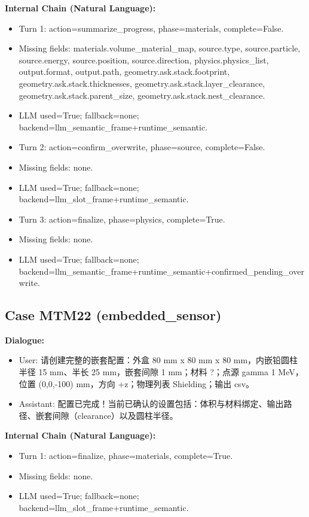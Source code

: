 \documentclass[11pt]{ctexart}
\begin{document}
\textbf{Internal Chain (Natural Language):}
\begin{itemize}
\item Turn 1: action=summarize\_progress, phase=materials, complete=False.
\item Missing fields: materials.volume\_material\_map, source.type, source.particle, source.energy, source.position, source.direction, physics.physics\_list, output.format, output.path, geometry.ask.stack.footprint, geometry.ask.stack.thicknesses, geometry.ask.stack.layer\_clearance, geometry.ask.stack.parent\_size, geometry.ask.stack.nest\_clearance.
\item LLM used=True; fallback=none; backend=llm\_semantic\_frame+runtime\_semantic.
\item Turn 2: action=confirm\_overwrite, phase=source, complete=False.
\item Missing fields: none.
\item LLM used=True; fallback=none; backend=llm\_slot\_frame+runtime\_semantic.
\item Turn 3: action=finalize, phase=physics, complete=True.
\item Missing fields: none.
\item LLM used=True; fallback=none; backend=llm\_semantic\_frame+runtime\_semantic+confirmed\_pending\_overwrite.
\end{itemize}
\subsection{Case MTM22 (embedded\_sensor)}
\textbf{Dialogue:}
\begin{itemize}
\item User: 请创建完整的嵌套配置：外盒 80 mm x 80 mm x 80 mm，内嵌铅圆柱半径 15 mm、半长 25 mm，嵌套间隙 1 mm；材料 ?；点源 gamma 1 MeV，位置 (0,0,-100) mm，方向 +z；物理列表 Shielding；输出 csv。
\item Assistant: 配置已完成！当前已确认的设置包括：体积与材料绑定、输出路径、嵌套间隙（clearance）以及圆柱半径。
\end{itemize}
\textbf{Internal Chain (Natural Language):}
\begin{itemize}
\item Turn 1: action=finalize, phase=materials, complete=True.
\item Missing fields: none.
\item LLM used=True; fallback=none; backend=llm\_slot\_frame+runtime\_semantic.
\end{itemize}
\end{document}
